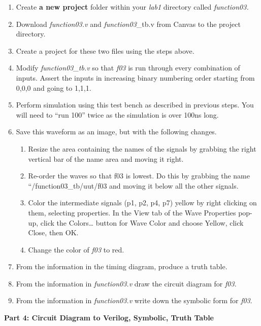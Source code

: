 \documentclass[
]{article}
\begin{document}
\begin{enumerate}
\def\labelenumi{\arabic{enumi}.}
\item
  Create \textbf{a new project} folder within your \emph{lab1} directory
  called \emph{function03.}
\item
  Download \emph{function03.v} and \emph{function03}\_tb.v from Canvas
  to the project directory.
\item
  Create a project for these two files using the steps above.
\item
  Modify \emph{function03\_tb.v} so that \emph{f03} is run through every
  combination of inputs. Assert the inputs in increasing binary
  numbering order starting from 0,0,0 and going to 1,1,1.
\item
  Perform simulation using this test bench as described in previous
  steps. You will need to ``run 100'' twice as the simulation is over
  100ns long.
\item
  Save this waveform as an image, but with the following changes.

  \begin{enumerate}
  \def\labelenumii{\alph{enumii}.}
  \item
    Resize the area containing the names of the signals by grabbing the
    right vertical bar of the name area and moving it right.
  \item
    Re-order the waves so that f03 is lowest. Do this by grabbing the
    name ``/function03\_tb/uut/f03 and moving it below all the other
    signals.
  \item
    Color the intermediate signals (p1, p2, p4, p7) yellow by right
    clicking on them, selecting properties. In the View tab of the Wave
    Properties pop-up, click the Colors\ldots{} button for Wave Color
    and choose Yellow, click Close, then OK.
  \item
    Change the color of \emph{f03} to red.
  \end{enumerate}
\item
  From the information in the timing diagram, produce a truth table.
\item
  From the information in \emph{function03.v} draw the circuit diagram
  for \emph{f03}.
\item
  From the information in \emph{function03.v} write down the symbolic
  form for \emph{f03}.
\end{enumerate}

\textbf{Part 4: Circuit Diagram to Verilog, Symbolic, Truth Table}
\end{document}
